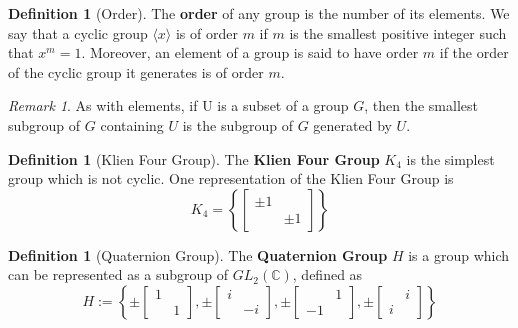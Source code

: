 \documentclass[12pt]{article}
\theoremstyle{definition}
\newtheorem{defn}[thm]{Definition}
\theoremstyle{remark}
\newtheorem{rmk}[thm]{Remark}
\numberwithin{equation}{section}
\newcommand\C{\mathbb C}    %
\newcommand\B[1]{\textbf{ #1}}
\begin{document}
\vspace{15pt}

\begin{defn}[Order]
        The \B{order} of any group is the number of its elements. We say that a cyclic group $\langle x \rangle$ is of order $m$ if $m$ is the smallest positive integer such that $x^m = 1$. Moreover, an element of a group is said to have order $m$ if the order of the cyclic group it generates is of order $m$.
\end{defn}


\vspace{15pt}

\begin{rmk}
        As with elements, if U is a subset of a group $G$, then the smallest subgroup of $G$ containing $U$ is the subgroup of $G$ generated by $U$.
\end{rmk}

\vspace{15pt}

\begin{defn}[Klien Four Group]
        The \B{Klien Four Group} $K_4$ is the simplest group which is not cyclic. One representation of the Klien Four Group is \begin{equation}
                K_4 = \left\{\begin{bmatrix} \pm 1 & \\ & \pm 1\end{bmatrix}\right\}
        \end{equation}
\end{defn}

\vspace{15pt}

\begin{defn}[Quaternion Group]
        The \B{Quaternion Group} $H$ is a group which can be represented as a subgroup of $GL_2(\C)$, defined as \begin{equation}
                H:= \left\{\pm\begin{bmatrix}1 & \\ & 1\end{bmatrix},\pm\begin{bmatrix}i & \\ & -i\end{bmatrix},\pm\begin{bmatrix} & 1 \\ -1 & \end{bmatrix},\pm\begin{bmatrix} & i \\ i & \end{bmatrix}\right\}
        \end{equation}
\end{defn}
\end{document}
